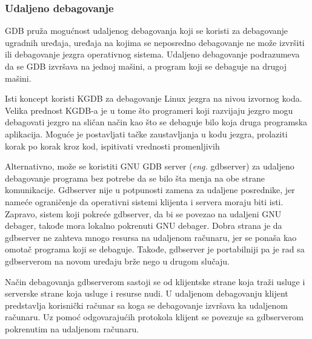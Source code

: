 \documentclass[a4paper]{article}
\begin{document}
\subsubsection{Udaljeno debagovanje}
\label{subsec:gdb_udaljeno}

GDB pruža mogućnost udaljenog debagovanja koji se koristi za debagovanje ugradnih uređaja, 
uređaja na kojima se neposredno debagovanje ne može izvršiti ili debagovanje jezgra operativnog sistema. 
Udaljeno debagovanje podrazumeva da se GDB izvršava na jednoj mašini, a program koji se debaguje na 
 drugoj mašini. %

Isti koncept koristi KGDB za debagovanje Linux jezgra na nivou izvornog koda. Velika prednost KGDB-a 
je u tome što programeri koji razvijaju jezgro mogu debagovati jezgro na sličan način kao što se 
debaguje bilo koja druga programska aplikacija. Moguće je postavljati tačke zaustavljanja u kodu jezgra, 
prolaziti korak po korak kroz kod, ispitivati vrednosti promenljivih 

Alternativno, može se koristiti GNU GDB server (\textit{eng.} gdbserver) za udaljeno debagovanje 
programa bez potrebe da se bilo šta menja na obe strane komunikacije. Gdbserver nije u potpunosti 
zamena za udaljene posrednike, jer nameće ograničenje da operativni sistemi klijenta i servera 
moraju biti isti. Zapravo, sistem koji pokreće gdbserver, da bi se povezao na udaljeni GNU debager, 
takođe mora lokalno pokrenuti GNU debager. Dobra strana je da gdbserver ne zahteva mnogo 
resursa na udaljenom računaru, jer se ponaša kao omotač programa koji se debaguje. 
Takođe, gdbserver je portabilniji pa je rad sa gdbserverom na novom uređaju brže nego u drugom slučaju. 

Način debagovanja gdbserverom sastoji se od klijentske strane koja traži usluge i serverske strane 
koja usluge i resurse nudi. U udaljenom debagovanju klijent predstavlja korisnički računar sa koga se 
debagovanje izvršava ka udaljenom računaru. Uz pomoć odgovarajućih protokola klijent se povezuje 
sa gdbserverom pokrenutim na udaljenom računaru.
\end{document}

